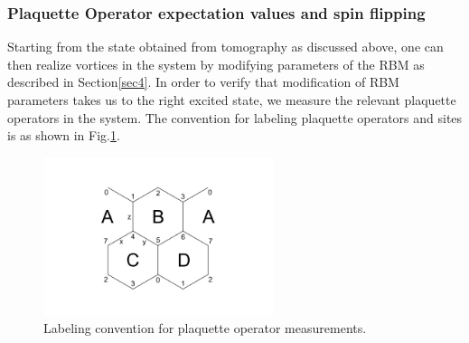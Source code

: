 \documentclass{article}
\begin{document}

\subsubsection*{Plaquette Operator expectation values and spin flipping}

Starting from the state obtained from tomography as discussed above, one can then realize vortices in the system by modifying parameters of the RBM as described in Section\hspace{0.2mm}\ref{sec4}. In order to verify that modification of RBM parameters takes us to the right excited state, we measure the relevant plaquette operators in the system. The convention for labeling plaquette operators and sites is as shown in Fig.\hspace{0.2mm}\ref{qst_vor}. 

\begin{figure}[!htb]
	\centering
	\includegraphics[width=0.6\textwidth]{./images/2x2.jpg}
	\caption{\label{qst_vor} Labeling convention for plaquette operator measurements.} 
\end{figure}
\end{document}
